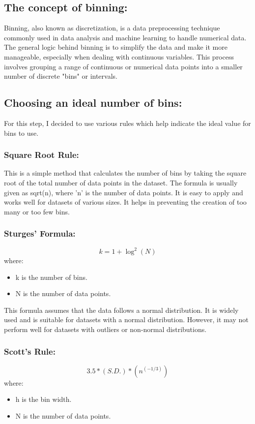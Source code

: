 \subsection{The concept of binning:}
Binning, also known as discretization, is a data preprocessing technique commonly used in data analysis and machine learning to handle numerical data. The general logic behind binning is to simplify the data and make it more manageable, especially when dealing with continuous variables. This process involves grouping a range of continuous or numerical data points into a smaller number of discrete "bins" or intervals.

\subsection{Choosing an ideal number of bins:}
For this step, I decided to use various rules which help indicate the ideal value for bins to use.

\subsubsection{Square Root Rule:}
This is a simple method that calculates the number of bins by taking the square root of the total number of data points in the dataset. The formula is usually given as sqrt(n), where 'n' is the number of data points. It is easy to apply and works well for datasets of various sizes. It helps in preventing the creation of too many or too few bins.

\subsubsection{Sturges’ Formula:}
\begin{equation}
k = 1 + \log^2(N)
\end{equation}
where:
\begin{itemize}
\item k is the number of bins.
\item N is the number of data points.
\end{itemize}

This formula assumes that the data follows a normal distribution. It is widely used and is suitable for datasets with a normal distribution. However, it may not perform well for datasets with outliers or non-normal distributions.

\subsubsection{Scott’s Rule:}
\begin{equation}
3.5 * (S.D.) * (n^(-1/3))
\end{equation}
where:
\begin{itemize}
\item h is the bin width.
\item N is the number of data points.
\end{itemize}

